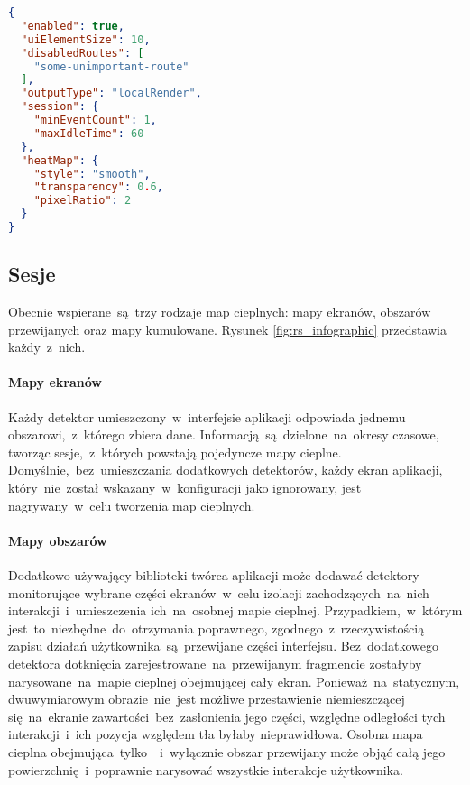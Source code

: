 \bigskip
\begin{lstlisting}[language=json,caption={Przykładowy plik konfiguracyjny~w~formacie json},label=lst:rs_config_json]
{
  "enabled": true,
  "uiElementSize": 10,
  "disabledRoutes": [
    "some-unimportant-route"
  ],
  "outputType": "localRender",
  "session": {
    "minEventCount": 1,
    "maxIdleTime": 60
  },
  "heatMap": {
    "style": "smooth",
    "transparency": 0.6,
    "pixelRatio": 2
  }
}
\end{lstlisting}

\subsection{Sesje}
Obecnie wspierane~są~trzy rodzaje map cieplnych: mapy ekranów, obszarów przewijanych oraz mapy kumulowane. Rysunek \ref{fig:rs_infographic} przedstawia każdy~z~nich.


\paragraph{Mapy ekranów} Każdy detektor umieszczony~w~interfejsie aplikacji odpowiada jednemu obszarowi,~z~którego zbiera dane. Informacją~są~dzielone~na~okresy czasowe, tworząc sesje,~z~których powstają pojedyncze mapy cieplne. Domyślnie,~bez~umieszczania dodatkowych detektorów, każdy ekran aplikacji, który~nie~został wskazany~w~konfiguracji jako ignorowany, jest nagrywany~w~celu tworzenia map cieplnych.


\paragraph{Mapy obszarów} Dodatkowo używający biblioteki twórca aplikacji może dodawać detektory monitorujące wybrane części ekranów~w~celu izolacji zachodzących~na~nich interakcji~i~umieszczenia ich~na~osobnej mapie cieplnej. Przypadkiem,~w~którym jest~to~niezbędne~do~otrzymania poprawnego, zgodnego~z~rzeczywistością zapisu działań użytkownika~są~przewijane części interfejsu. Bez~dodatkowego detektora dotknięcia zarejestrowane~na~przewijanym fragmencie zostałyby narysowane~na~mapie cieplnej obejmującej cały ekran. Ponieważ~na~statycznym, dwuwymiarowym obrazie~nie~jest możliwe przestawienie niemieszczącej się~na~ekranie zawartości~bez~zasłonienia jego części, względne odległości tych interakcji~i~ich pozycja względem tła byłaby nieprawidłowa. Osobna mapa cieplna obejmująca~tylko~~i~wyłącznie obszar przewijany może objąć całą jego powierzchnię~i~poprawnie narysować wszystkie interakcje użytkownika.

